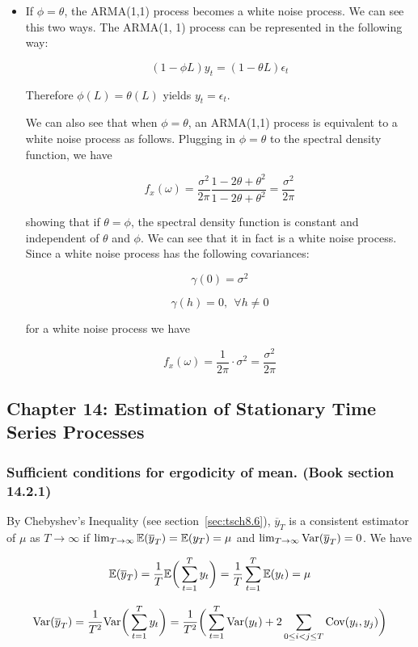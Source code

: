 \begin{itemize}
\item If \(\phi = \theta\), the ARMA(1,1) process becomes a white noise process. We can see this two ways. The ARMA(1, 1) process can be represented in the following way:

\[
(1 - \phi L)y_t = (1 - \theta L) \epsilon_t
\]

Therefore \(\phi(L) = \theta(L)\) yields \(y_t = \epsilon_t\). 


We can also see that when \(\phi = \theta\), an ARMA(1,1) process is equivalent to a white noise process as follows. Plugging in \(\phi = \theta\) to the spectral density function, we have

\[
f_x(\omega) = \frac{\sigma^2}{2\pi} \frac{1 - 2\theta + \theta^2}{1 -2\theta + \theta^2} = \frac{\sigma^2}{2\pi}
\]

showing that if \(\theta = \phi\), the spectral density function is constant and independent of \(\theta\) and \(\phi \). We can see that it in fact is a white noise process. Since a white noise process has the following covariances:

\[
\gamma(0) = \sigma^2
\]

\[
\gamma(h) =0, \ \ \forall h \neq 0
\]

for a white noise process we have

\[
f_x(\omega) = \frac{1}{2\pi} \cdot \sigma^2 = \frac{\sigma^2}{2 \pi}
\]


\end{itemize}

\subsection{Chapter 14: Estimation of Stationary Time Series Processes}

\subsubsection{Sufficient conditions for ergodicity of mean. (Book section 14.2.1)} By Chebyshev's Inequality (see section~\ref{sec:tsch8.6}), \(\overline{y}_T\) is a consistent estimator of \(\mu\) as \(T \to \infty\) if \(\lim_{T \to \infty} \mathbb{E}(\overline{y}_T) = \mathbb{E}(y_T) = \mu\) and \(\lim_{T \to \infty} \mathrm{Var}(\overline{y}_T) = 0\). We have

\[
\mathbb{E}(\overline{y}_T) = \frac{1}{T} \mathbb{E} \bigg( \sum_{t=1}^T y_t \bigg) = \frac{1}{T}  \sum_{t=1}^T \mathbb{E} (y_t) = \mu
\]

\[
\mathrm{Var}(\overline{y}_T) = \frac{1}{T^2} \mathrm{Var} \bigg( \sum_{t=1}^T y_t \bigg) = \frac{1}{T^2} \bigg(\sum_{t=1}^T  \mathrm{Var}(y_t) + 2 \sum_{0 \leq i < j \leq T } \mathrm{Cov}(y_i, y_j)   \bigg)
\]

